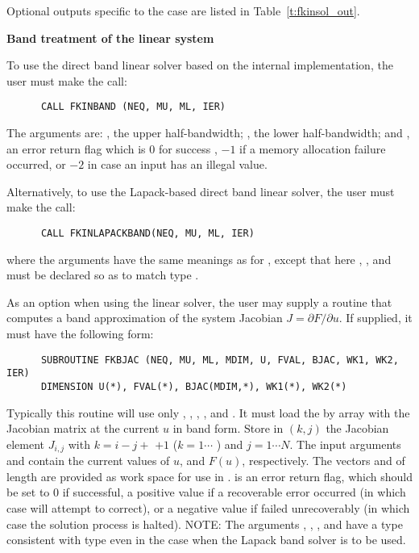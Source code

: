 \begin{Steps}
  Optional outputs specific to the {\dense} case are listed in
  Table~\ref{t:fkinsol_out}.


  {\s} {\bf Band treatment of the linear system}
  
  To use the direct band linear solver based on the internal {\kinsol}
  implementation, the user must make the call:
\begin{verbatim}
      CALL FKINBAND (NEQ, MU, ML, IER)
\end{verbatim}
  The arguments are: , the upper half-bandwidth; , 
  the lower half-bandwidth; and , an error return flag which is 
  $0$ for success , $-1$ if a memory allocation failure occurred, or $-2$ 
  in case an input has an illegal value.     
  
  Alternatively, to use the Lapack-based direct band linear solver, 
  the user must make the call:
\begin{verbatim}
      CALL FKINLAPACKBAND(NEQ, MU, ML, IER)
\end{verbatim}
  where the arguments have the same meanings as for , except
  that here , , and  must be declared so as to match
  {\C} type .

  As an option when using the {\band} linear solver, the user may supply a
  routine that computes a band approximation of the system Jacobian 
  $J = \partial F / \partial u$. If supplied, it must have the following form:
\begin{verbatim}
      SUBROUTINE FKBJAC (NEQ, MU, ML, MDIM, U, FVAL, BJAC, WK1, WK2, IER)
      DIMENSION U(*), FVAL(*), BJAC(MDIM,*), WK1(*), WK2(*)
\end{verbatim}
  Typically this routine will use only , , ,
  , and .
  It must load the  by  array  with the Jacobian matrix
  at the current $u$ in band form.  Store in $(k,j)$ the Jacobian
  element $J_{i,j}$ with $k = i - j + $  $ + 1$ ($k = 1 \cdots $
  ) and $j = 1 \cdots N$.
  The input arguments  and  contain the current
  values of $u$, and $F(u)$, respectively.
  The vectors  and 
  of length  are provided as work space for use in
  .
   is an error return flag, which should be set to $0$ if successful,
  a positive value if a recoverable error occurred (in which case {\kinsol} will
  attempt to correct), or a negative value if  failed unrecoverably
  (in which case the solution process is halted).
  NOTE: The arguments , , , and  have a type
  consistent with {\C} type  even in the case when the Lapack band
  solver is to be used.


\end{Steps}

